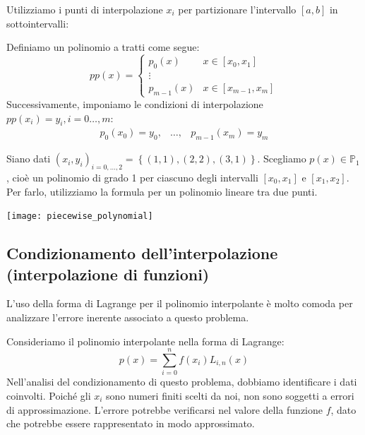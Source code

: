 \documentclass{article}
\begin{document}
Utilizziamo i punti di interpolazione $x_i$ per partizionare l'intervallo
$[a,b]$ in sottointervalli:

\begin{center}
\end{center}

Definiamo un polinomio a tratti come segue:
$$pp(x)=\begin{cases}
    p_0(x) & x\in[x_0,x_1]\\
    \vdots \\
    p_{m-1}(x) & x\in[x_{m-1},x_m]
\end{cases}$$
Successivamente, imponiamo le condizioni di interpolazione $pp(x_i)=y_i,i=0\ldots,m$:
\begin{equation*}
    \begin{array}{ccc}
        p_0(x_0) = y_0, & \ldots, & p_{m-1}(x_m) = y_m
    \end{array}
\end{equation*}
\begin{example}
    Siano dati $(x_i,y_i)_{i=0,\ldots,2}=\left\{(1,1),(2,2),(3,1)\right\}$.
    Scegliamo $p(x)\in \mathbb{P}_1$, cioè un polinomio di grado 1 per
    ciascuno degli intervalli $[x_0,x_1]$ e $[x_1,x_2]$. Per farlo,
    utilizziamo la formula per un polinomio lineare tra due punti.
    \begin{center}
        \texttt{[image: piecewise\_polynomial]}
    \end{center}
\end{example}
\subsection{Condizionamento dell'interpolazione (interpolazione di funzioni)}
L'uso della forma di Lagrange per il polinomio interpolante è molto comoda per
analizzare l'errore inerente associato a questo problema.

Consideriamo il polinomio interpolante nella forma di Lagrange:
$$p(x)=\displaystyle\sum_{i=0}^{n}f(x_i)L_{i,n}(x)$$
Nell'analisi del condizionamento di questo problema, dobbiamo identificare
i dati  coinvolti. Poiché gli $x_i$ sono numeri finiti scelti da noi, non sono
soggetti a errori di approssimazione. L'errore potrebbe verificarsi nel 
valore della funzione $f$, dato che potrebbe essere rappresentato in modo
approssimato.
\end{document}
